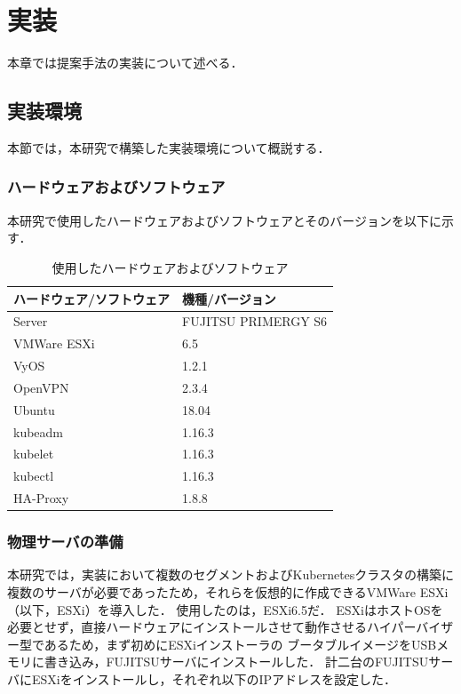 \chapter{実装}
\label{implementation}

本章では提案手法の実装について述べる．

\section{実装環境}
\label{implementation:environment}

本節では，本研究で構築した実装環境について概説する．

\subsection{ハードウェアおよびソフトウェア}
\label{implementation:environment:resouces}

本研究で使用したハードウェアおよびソフトウェアとそのバージョンを以下に示す．

\begin{table}[htb]
  \begin{center}
    \caption{使用したハードウェアおよびソフトウェア}
    \begin{tabular}{|l|l|} \hline
      ハードウェア/ソフトウェア & 機種/バージョン \\ \hline
      Server & FUJITSU PRIMERGY S6 \\ \hline
      VMWare ESXi & 6.5 \\ \hline
      VyOS & 1.2.1 \\ \hline
      OpenVPN & 2.3.4 \\ \hline
      Ubuntu & 18.04 \\ \hline
      kubeadm & 1.16.3 \\ \hline
      kubelet & 1.16.3 \\ \hline
      kubectl & 1.16.3 \\ \hline
      HA-Proxy & 1.8.8 \\ \hline
    \end{tabular}
  \end{center}
\end{table}

\subsection{物理サーバの準備}
\label{implementation:esxi}

本研究では，実装において複数のセグメントおよびKubernetesクラスタの構築に複数のサーバが必要であったため，それらを仮想的に作成できるVMWare ESXi（以下，ESXi）を導入した．
使用したのは，ESXi6.5だ．
ESXiはホストOSを必要とせず，直接ハードウェアにインストールさせて動作させるハイパーバイザー型であるため，まず初めにESXiインストーラの
ブータブルイメージをUSBメモリに書き込み，FUJITSUサーバにインストールした．
計二台のFUJITSUサーバにESXiをインストールし，それぞれ以下のIPアドレスを設定した．

